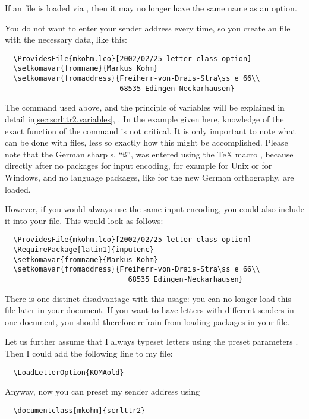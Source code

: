 \begin{Explain}
  If an  file is loaded
  via , then it may no longer have the same name
  as an option.
\end{Explain}

\begin{Example}
  You do not want to enter your sender address every time, so you
  create an  file with the necessary data, like this:
\begin{lstlisting}
  \ProvidesFile{mkohm.lco}[2002/02/25 letter class option]
  \setkomavar{fromname}{Markus Kohm}
  \setkomavar{fromaddress}{Freiherr-von-Drais-Stra\ss e 66\\
                           68535 Edingen-Neckarhausen}
\end{lstlisting}
The command  used above, and the principle of
variables will be explained in detail
in\autoref{sec:scrlttr2.variables},
. In the example given
here, knowledge of the exact function of the command is not
critical. It is only important to note what can be done with
 files, less so exactly how this might be
accomplished. Please note that the German sharp s, ``\ss'', was
entered using the {\TeX} macro , because directly after
 no packages for input encoding, for example
\PValue{[latin1]} for Unix or
\PValue{[ansinew]} for Windows,
and no language packages, like
 for the
new German orthography, are loaded.
  
However, if you would always use the same input encoding, you could
also include it into your  file. This would look as follows:
\begin{lstlisting}
  \ProvidesFile{mkohm.lco}[2002/02/25 letter class option]
  \RequirePackage[latin1]{inputenc}
  \setkomavar{fromname}{Markus Kohm}
  \setkomavar{fromaddress}{Freiherr-von-Drais-Stra\ss e 66\\
                             68535 Edingen-Neckarhausen}
\end{lstlisting}
There is one distinct disadvantage with this usage: you can no longer
load this  file later in your document. If you want to have
letters with different senders in one document, you should therefore
refrain from loading packages in your  file.
  
Let us further assume that I always typeset letters using the preset
parameters . Then I could add the following line to my
 file:
\begin{lstlisting}
  \LoadLetterOption{KOMAold}
\end{lstlisting}
  
  Anyway, now you can preset my sender address using
\begin{lstlisting}
  \documentclass[mkohm]{scrlttr2}
\end{lstlisting}
\end{Example}

